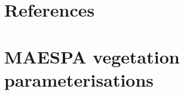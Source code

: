 \documentclass[final,3p,times,authoryear]{elsarticle}
\begin{document}
\section{References}\label{sec:ref}
   
  


\begin{thebibliography}{00}


\bibitem[ ()]{}

\end{thebibliography}


\appendix




\section{MAESPA vegetation parameterisations}\label{sec:maespavegpara}  
%
%
%
\end{document}
